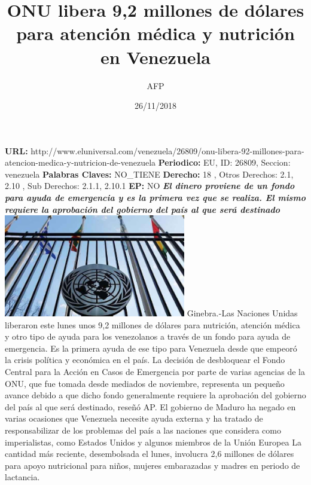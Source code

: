 \documentclass{article}%
\title{\textbf{ONU libera 9,2 millones de dólares para atención médica y nutrición en Venezuela}}%
\author{AFP}%
\date{26/11/2018}%
\begin{document}
%
\normalsize%
\maketitle%
\textbf{URL: }%
http://www.eluniversal.com/venezuela/26809/onu{-}libera{-}92{-}millones{-}para{-}atencion{-}medica{-}y{-}nutricion{-}de{-}venezuela\newline%
%
\textbf{Periodico: }%
EU, %
ID: %
26809, %
Seccion: %
venezuela\newline%
%
\textbf{Palabras Claves: }%
NO\_TIENE\newline%
%
\textbf{Derecho: }%
18%
, Otros Derechos: %
2.1, 2.10%
, Sub Derechos: %
2.1.1, 2.10.1%
\newline%
%
\textbf{EP: }%
NO\newline%
\newline%
%
\textbf{\textit{El dinero proviene de un fondo para ayuda de emergencia y es la primera vez que se realiza. El mismo requiere la aprobación del gobierno del país al que será destinado}}%
\newline%
\newline%
%
\includegraphics[width=300px]{259.jpg}%
\newline%
%
Ginebra.{-}Las Naciones Unidas liberaron este lunes unos 9,2 millones de dólares para nutrición, atención médica y otro tipo de ayuda para los venezolanos a través de un fondo para ayuda de emergencia.%
\newline%
%
Es la primera ayuda de ese tipo para Venezuela desde que empeoró la crisis política y económica en el país.%
\newline%
%
La decisión de desbloquear el Fondo Central para la Acción en Casos de Emergencia por parte de varias agencias de la ONU, que fue tomada desde mediados de noviembre, representa un pequeño avance debido a que dicho fondo generalmente requiere la aprobación del gobierno del país al que será destinado, reseñó AP.%
\newline%
%
El gobierno de Maduro ha negado en varias ocasiones que Venezuela necesite ayuda externa y ha tratado de responsabilizar de los problemas del país a las naciones que considera como imperialistas, como Estados Unidos y algunos miembros de la Unión Europea%
\newline%
%
La cantidad más reciente, desembolsada el lunes, involucra 2,6 millones de dólares para apoyo nutricional para niños, mujeres embarazadas y madres en periodo de lactancia.%
\newline%
%
\end{document}
